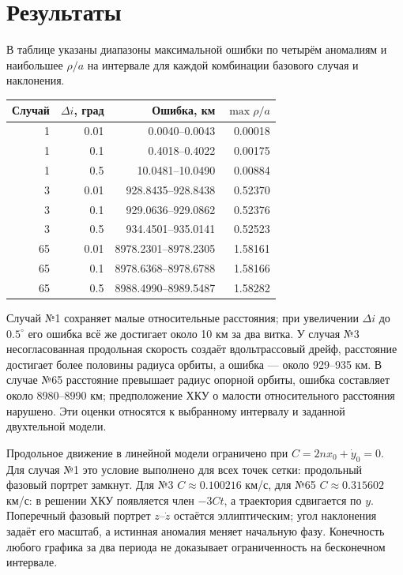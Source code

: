 \documentclass[12pt,a4paper]{article}
\begin{document}
\section{Результаты}
В таблице указаны диапазоны максимальной ошибки по четырём аномалиям и наибольшее $\rho/a$ на интервале для каждой комбинации базового случая и наклонения.
\begin{center}\small
\begin{tabular}{rrrr}\toprule
Случай & $\Delta i$, град & Ошибка, км & $\max\rho/a$ \\\midrule
1 & 0.01 & 0.0040--0.0043 & 0.00018 \\
1 & 0.1 & 0.4018--0.4022 & 0.00175 \\
1 & 0.5 & 10.0481--10.0490 & 0.00884 \\
3 & 0.01 & 928.8435--928.8438 & 0.52370 \\
3 & 0.1 & 929.0636--929.0862 & 0.52376 \\
3 & 0.5 & 934.4501--935.0141 & 0.52523 \\
65 & 0.01 & 8978.2301--8978.2305 & 1.58161 \\
65 & 0.1 & 8978.6368--8978.6788 & 1.58166 \\
65 & 0.5 & 8988.4990--8989.5487 & 1.58282 \\\bottomrule
\end{tabular}\end{center}
Случай №1 сохраняет малые относительные расстояния; при увеличении $\Delta i$ до $0.5^\circ$ его ошибка всё же достигает около 10 км за два витка. У случая №3 несогласованная продольная скорость создаёт вдольтрассовый дрейф, расстояние достигает более половины радиуса орбиты, а ошибка — около 929--935 км. В случае №65 расстояние превышает радиус опорной орбиты, ошибка составляет около 8980--8990 км; предположение ХКУ о малости относительного расстояния нарушено. Эти оценки относятся к выбранному интервалу и заданной двухтельной модели.

Продольное движение в линейной модели ограничено при $C=2nx_0+\dot y_0=0$. Для случая №1 это условие выполнено для всех точек сетки: продольный фазовый портрет замкнут. Для №3 $C\approx0.100216$ км/с, для №65 $C\approx0.315602$ км/с: в решении ХКУ появляется член $-3Ct$, а траектория сдвигается по $y$. Поперечный фазовый портрет $z$--$\dot z$ остаётся эллиптическим; угол наклонения задаёт его масштаб, а истинная аномалия меняет начальную фазу. Конечность любого графика за два периода не доказывает ограниченность на бесконечном интервале.
\end{document}

